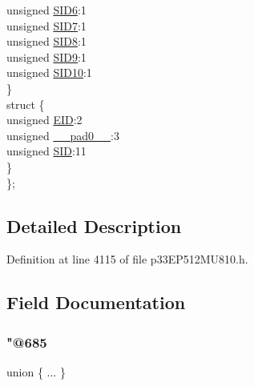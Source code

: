 \begin{DoxyCompactItemize}
\begin{tabbing}
\>\>unsigned \hyperlink{structtag_c1_r_x_f7_s_i_d_b_i_t_s_a70d70952133eb2389d5c326f9f0e8035}{SID6}:1\\
\>\>unsigned \hyperlink{structtag_c1_r_x_f7_s_i_d_b_i_t_s_a34097fb76decd431701fa2d86a22328e}{SID7}:1\\
\>\>unsigned \hyperlink{structtag_c1_r_x_f7_s_i_d_b_i_t_s_afe74894633244fdb0b0c01b4e8c522e7}{SID8}:1\\
\>\>unsigned \hyperlink{structtag_c1_r_x_f7_s_i_d_b_i_t_s_a33587704948067005c2a6a3ccc503c99}{SID9}:1\\
\>\>unsigned \hyperlink{structtag_c1_r_x_f7_s_i_d_b_i_t_s_a1a9084031c7f5fb16007feeebf0d8216}{SID10}:1\\
\>\} \\
\>struct \{\\
\>\>unsigned \hyperlink{structtag_c1_r_x_f7_s_i_d_b_i_t_s_ae80b378c9141f7c03e0b4e55b5f4b54d}{EID}:2\\
\>\>unsigned \hyperlink{structtag_c1_r_x_f7_s_i_d_b_i_t_s_adf71f3d8410c1f1dbbc96680a92c49af}{\_\_pad0\_\_}:3\\
\>\>unsigned \hyperlink{structtag_c1_r_x_f7_s_i_d_b_i_t_s_af88edf93b2fee2432665bd84f51287e4}{SID}:11\\
\>\} \\
\}; \\

\end{tabbing}\end{DoxyCompactItemize}


\subsection{Detailed Description}


Definition at line 4115 of file p33\+E\+P512\+M\+U810.\+h.



\subsection{Field Documentation}
\mbox{\label{structtag_c1_r_x_f7_s_i_d_b_i_t_s_ad009c7cf321cd1d8a1f31865913cdc81}} 
\subsubsection{\texorpdfstring{"@685}{@685}}
{\footnotesize\ttfamily union \{ ... \} }

\mbox{\label{structtag_c1_r_x_f7_s_i_d_b_i_t_s_adf71f3d8410c1f1dbbc96680a92c49af}} 
